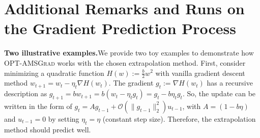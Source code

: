 \documentclass[11pt]{article}
\theoremstyle{k}
\begin{document}
\section{Additional Remarks and Runs on the Gradient Prediction Process}
\textbf{Two illustrative examples.}\hspace{0.1in}We provide two toy examples to demonstrate how \textsc{OPT-AMSGrad} works with the chosen extrapolation method. First, consider minimizing a quadratic function $H(w) := \frac{b}{2} w^2 $  
with vanilla gradient descent method $w_{t+1} = w_t - \eta_t \nabla H(w_t)$. 
The gradient $g_{t}:= \nabla H(w_{t})$ has a recursive description as  $g_{t+1} = b w_{t+1} = b ( w_t  - \eta_t g_t ) = g_t - b \eta_t g_t  $.
So, the update can be written in the form of $g_t = A g_{t-1}  + \mathcal{O}( \| g_{t-1} \|_2^2 ) u_{t-1}$, with $A = (1 - b \eta)$ and $u_{t-1}=0$ by setting $\eta_t=\eta$ (constant step size).
Therefore, the extrapolation method should predict well.
\end{document}
